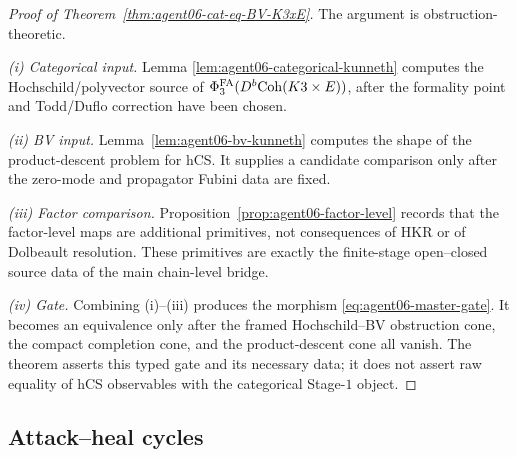 \begin{proof}[Proof of Theorem~\ref{thm:agent06-cat-eq-BV-K3xE}]
The argument is obstruction-theoretic.

\textit{(i) Categorical input.} Lemma
\ref{lem:agent06-categorical-kunneth} computes the Hochschild/polyvector
source of $\Phi^{\mathrm{FA}}_3(D^b\mathrm{Coh}(K3\times E))$, after the formality point and
Todd/Duflo correction have been chosen.

\textit{(ii) BV input.} Lemma~\ref{lem:agent06-bv-kunneth} computes the
shape of the product-descent problem for hCS. It supplies a candidate
comparison only after the zero-mode and propagator Fubini data are
fixed.

\textit{(iii) Factor comparison.} Proposition~\ref{prop:agent06-factor-level}
records that the factor-level maps are additional primitives, not
consequences of HKR or of Dolbeault resolution. These primitives are
exactly the finite-stage open--closed source data of the main
chain-level bridge.

\textit{(iv) Gate.} Combining \textup{(i)--(iii)} produces the morphism
\eqref{eq:agent06-master-gate}. It becomes an equivalence only after
the framed Hochschild--BV obstruction cone, the compact completion
cone, and the product-descent cone all vanish. The theorem asserts this
typed gate and its necessary data; it does not assert raw equality of
hCS observables with the categorical Stage-$1$ object.
\end{proof}

\subsection*{Attack--heal cycles}
\label{sec:agent06-attack-heal}

